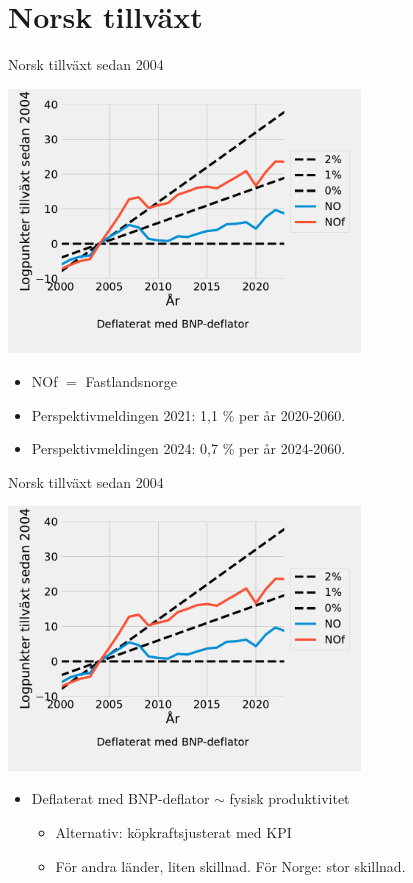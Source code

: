 \documentclass{beamer}
\begin{document}
\section{Norsk tillväxt}
\begin{frame}{Norsk tillväxt sedan 2004}
    \begin{center}
        \includegraphics[width=0.7\textwidth]{figures/GDP_growth0_NO.pdf}
        \begin{itemize}
            \small
            \item NOf $=$ Fastlandsnorge
            \item Perspektivmeldingen 2021: 1,1 \% per år 2020-2060.
            \item Perspektivmeldingen 2024: 0,7 \% per år 2024-2060.
        \end{itemize}
    \end{center}
\end{frame}

\begin{frame}{Norsk tillväxt sedan 2004}
    \begin{center}
        \includegraphics[width=0.7\textwidth]{figures/GDP_growth0_NO.pdf}
        \begin{itemize}
            \small
            \item Deflaterat med BNP-deflator $\sim$ fysisk produktivitet
            \begin{itemize}
                \item Alternativ: köpkraftsjusterat med KPI
                \item För andra länder, liten skillnad. För Norge: stor skillnad.
            \end{itemize}
        \end{itemize}
    \end{center}
\end{frame}
\end{document}

